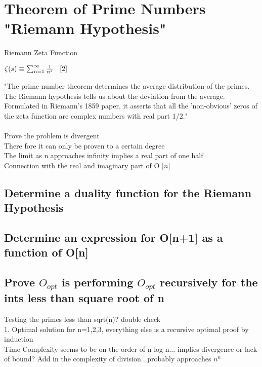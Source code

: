 \documentclass[11pt]{article}
\begin{document}
\section{Theorem of Prime Numbers "Riemann Hypothesis"}
Riemann Zeta Function
\begin{center}
$
\zeta (s) \equiv \sum_{n=1}^{\infty} \frac{1}{n^s} \hspace{3mm} \lbrack 2 \rbrack
$
\end{center}
"The prime number theorem determines the average distribution of the primes. The Riemann hypothesis tells us about the deviation from the average. Formulated in Riemann's 1859 paper, it asserts that all the 'non-obvious' zeros of the zeta function are complex numbers with real part 1/2." \rbrack\\
\\
Prove the problem is divergent\\
There fore it can only be proven to a certain degree\\
The limit as n approaches infinity implies a real part of one half\\
Connection with the real and imaginary part of O $\lbrack n \rbrack$

\subsection{Determine a duality function for the Riemann Hypothesis}
\subsection{Determine an expression for O[n+1] as a function of O[n]}

\subsection{Prove $O_{opt}$ is performing $O_{opt}$ recursively for the ints less than square root of n}
Testing the primes less than sqrt(n)? double check \\
1. Optimal solution for n=1,2,3, everything else is a recursive optimal proof by induction\\
Time Complexity seems to be on the order of n log n... implies divergence or lack of bound? Add in the complexity of division.. probably approaches $n^n$

\end{document}
